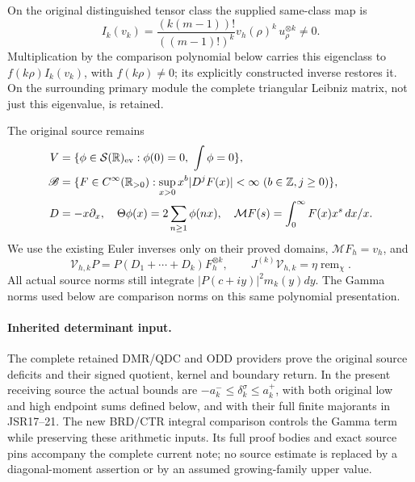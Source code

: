\documentclass[11pt,a4paper]{article}
\newcommand{\R}{\mathbb R}
\newcommand{\rem}{\operatorname{rem}}
\begin{document}
On the original distinguished tensor class the supplied same-class map is
\begin{equation}
 I_k(v_k)=\frac{(k(m-1))!}{((m-1)!)^k}v_h(\rho)^k\,u_\rho^{\otimes k}\ne0.
\end{equation}
Multiplication by the comparison polynomial below carries this eigenclass to $f(k\rho)I_k(v_k)$, with $f(k\rho)\ne0$; its explicitly constructed inverse restores it. On the surrounding primary module the complete triangular Leibniz matrix, not just this eigenvalue, is retained.

The original source remains
\begin{align}
 V&=\{\phi\in\mathcal S(\R)_{\rm ev}:\phi(0)=0,\ \int\phi=0\},\\
 \mathscr B&=\{F\in C^\infty(\R_{>0}):\sup_{x>0}x^b|D^jF(x)|<\infty\ (b\in\mathbb Z,j\ge0)\},\\
 D&=-x\partial_x,\quad \Theta\phi(x)=2\sum_{n\ge1}\phi(nx),\quad
 \mathcal MF(s)=\int_0^\infty F(x)x^s\,dx/x.
\end{align}
We use the existing Euler inverses only on their proved domains, $\mathcal MF_h=v_h$, and
\begin{equation}
 \mathcal V_{h,k}P=P(D_1+\cdots+D_k)F_h^{\otimes k},\qquad
 J^{(k)}\mathcal V_{h,k}=\eta\rem_\chi.
\end{equation}
All actual source norms still integrate $|P(c+iy)|^2m_k(y)dy$. The Gamma norms used below are comparison norms on this same polynomial presentation.

\paragraph{Inherited determinant input.}
The complete retained DMR/QDC and ODD providers prove the
original source deficits and their signed quotient, kernel and
boundary return. In the present receiving source the actual bounds
are $-a_k^-\leq\delta_k^\sigma\leq a_k^+$, with both original
low and high endpoint sums defined below, and with their full
finite majorants in JSR17--21. The new BRD/CTR integral comparison
controls the Gamma term while preserving these arithmetic inputs.
Its full proof bodies and exact source pins accompany the complete
current note; no source estimate is replaced by a diagonal-moment
assertion or by an assumed growing-family upper value.
\end{document}
